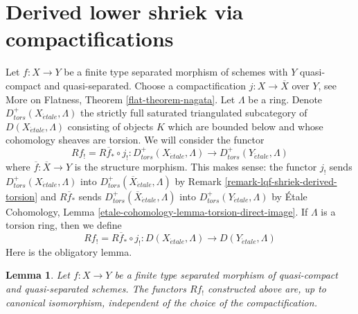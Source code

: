 \documentclass{stacks-project}
\theoremstyle{plain}
\newtheorem{lemma}[subsection]{Lemma}
\theoremstyle{definition}
\theoremstyle{remark}
\numberwithin{equation}{subsection}
\def\etale{{\acute{e}tale}}
\begin{document}
\section{Derived lower shriek via compactifications}
\label{section-derived-lower-shriek-compactification}

\noindent
Let $f : X \to Y$ be a finite type separated morphism of schemes
with $Y$ quasi-compact and quasi-separated. Choose a compactification
$j : X \to \overline{X}$ over $Y$, see
More on Flatness, Theorem \ref{flat-theorem-nagata}.
Let $\Lambda$ be a ring. Denote $D^+_{tors}(X_\etale, \Lambda)$
the strictly full saturated triangulated subcategory of
$D(X_\etale, \Lambda)$ consisting of objects $K$ which are bounded below
and whose cohomology sheaves are torsion. We will consider the
functor
$$
Rf_! = R\overline{f}_* \circ j_! :
D^+_{tors}(X_\etale, \Lambda)
\longrightarrow
D^+_{tors}(Y_\etale, \Lambda)
$$
where $\overline{f} : \overline{X} \to Y$ is the structure morphism.
This makes sense: the functor $j_!$ sends $D^+_{tors}(X_\etale, \Lambda)$ into
$D^+_{tors}(\overline{X}_\etale, \Lambda)$ by
Remark \ref{remark-lqf-shriek-derived-torsion} and $R\overline{f}_*$ sends
$D^+_{tors}(\overline{X}_\etale, \Lambda)$ into $D^+_{tors}(Y_\etale, \Lambda)$
by \'Etale Cohomology, Lemma \ref{etale-cohomology-lemma-torsion-direct-image}.
If $\Lambda$ is a torsion ring, then we define
$$
Rf_! = R\overline{f}_* \circ j_! :
D(X_\etale, \Lambda)
\longrightarrow
D(Y_\etale, \Lambda)
$$
Here is the obligatory lemma.

\begin{lemma}
\label{lemma-shriek-well-defined}
Let $f : X \to Y$ be a finite type separated morphism of quasi-compact
and quasi-separated schemes. The functors $Rf_!$ constructed above
are, up to canonical isomorphism, independent of the choice of the
compactification.
\end{lemma}
\end{document}
